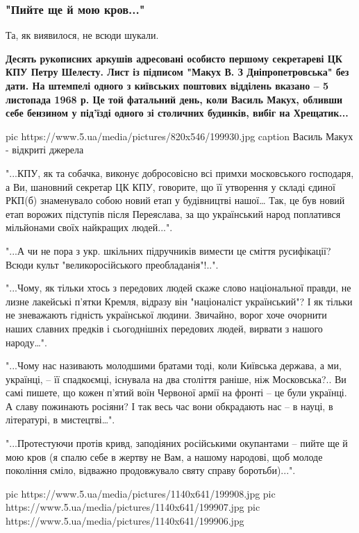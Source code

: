 \subsubsection{"Пийте ще й мою кров..."}

Та, як виявилося, не всюди шукали.

{\bfseries
Десять рукописних аркушів адресовані особисто першому секретареві ЦК КПУ
Петру Шелесту. Лист із підписом "Макух В. З Дніпропетровська" без дати.
На штемпелі одного з київських поштових відділень вказано – 5 листопада
1968 р. Це той фатальний день, коли Василь Макух, обливши себе бензином
у під'їзді одного зі столичних будинків, вибіг на Хрещатик...
}

\ifcmt
pic https://www.5.ua/media/pictures/820x546/199930.jpg
caption Василь Макух - відкриті джерела
\fi


"...КПУ, як та собачка, виконує добросовісно всі примхи московського
господаря, а Ви, шановний секретар ЦК КПУ, говорите, що її утворення у
складі єдиної РКП(б) знаменувало собою новий етап у будівництві нашої…
Так, це був новий етап ворожих підступів після Переяслава, за що
український народ поплатився мільйонами своїх найкращих людей...".

"...А чи не пора з укр. шкільних підручників вимести це сміття
русифікації? Всюди культ "великоросійського преобладанія"!..".

"...Чому, як тільки хтось з передових людей скаже слово національної
правди, не лизне лакейські п'ятки Кремля, відразу він "націоналіст
український"? І як тільки не зневажають гідність української людини.
Звичайно, ворог хоче очорнити наших славних предків і сьогоднішніх
передових людей, вирвати з нашого народу…".

"...Чому нас називають молодшими братами тоді, коли Київська держава, а
ми, українці, – її спадкоємці, існувала на два століття раніше, ніж
Московська?.. Ви самі пишете, що кожен п'ятий воїн Червоної армії на
фронті – це були українці. А славу пожинають росіяни? І так весь час вони
обкрадають нас – в науці, в літературі, в мистецтві…".

"...Протестуючи протів кривд, заподіяних російськими окупантами – пийте ще
й мою кров (я спалю себе в жертву не Вам, а нашому народові, щоб молоде
покоління сміло, відважно продовжувало святу справу боротьби)...".

\ifcmt
pic https://www.5.ua/media/pictures/1140x641/199908.jpg
pic https://www.5.ua/media/pictures/1140x641/199907.jpg
pic https://www.5.ua/media/pictures/1140x641/199906.jpg
\fi

